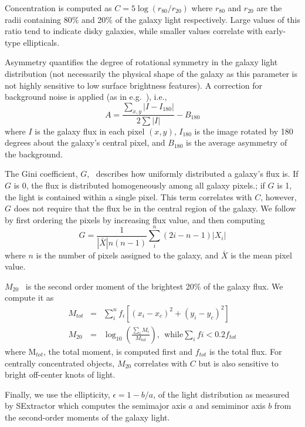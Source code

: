 \documentclass[twocolumn]{aastex6}
\newcommand{\rr}[1]{$r_{#1}$}
\newcommand{\M}[1]{$M_{#1}$}
\begin{document}
Concentration is computed as $C = 5\log(r_{80}/ r_{20})$ where \rr{80} and \rr{20} are the radii containing 80\% and 20\% of the galaxy light respectively.  Large values of this ratio tend to indicate disky galaxies, while smaller values correlate with early-type ellipticals. 

Asymmetry quantifies the degree of rotational symmetry in the galaxy light distribution (not necessarily the physical shape of the galaxy as this parameter is not highly sensitive to low surface brightness features). A correction for background noise is applied (as in e.g.~\cite{Conselice2000}), i.e., 
\begin{equation}
A = \frac{\sum_{x,y} |I - I_{180}|}{ 2\sum|I|} - B_{180}
\end{equation}
where $I$ is the galaxy flux in each pixel $(x, y)$, $I_{180}$ is the image rotated by 180 degrees about the galaxy's central pixel, and $B_{180}$ is the average asymmetry of the background. 

The Gini coefficient, $G$,~\citep{Glasser1962, Abraham2003} describes how uniformly distributed a galaxy's flux is.  If $G$ is 0, the flux is distributed homogeneously among all galaxy pixels.; if $G$ is 1,  the light is contained within a single pixel. This term correlates with $C$, however, $G$ does not require that the flux be in the central region of the galaxy.  We follow~\cite{Lotz2004} by first ordering the pixels by increasing flux value, and then computing
\begin{equation}
G = \frac{1}{|\bar X|n(n-1)}\sum_i^n(2i-n-1)|X_i|
\end{equation}
where $n$ is the number of pixels assigned to the galaxy, and $\bar X$ is the mean pixel value. 

\M{20}~\citep{Lotz2004} is the second order moment of the brightest 20\% of the galaxy flux. We compute it as
\begin{eqnarray}
 M_{tot} & = & \sum_i^nf_i[(x_i-x_c)^2 + (y_i-y_c)^2]  \\
 M_{20} & = & \log_{10} (\frac{\sum_iM_i}{M_{tot}}), ~~\textrm{while} \sum_ifi < 0.2f_{tot}
\end{eqnarray}
where M$_{tot}$, the total moment, is computed first and $f_{tot}$ is the total flux. For centrally concentrated objects, \M{20} correlates with $C$ but is also sensitive to bright off-center knots of light. 

Finally, we use the ellipticity, $\epsilon = 1 - b/a$, of the light distribution as measured by SExtractor which computes the semimajor axis $a$ and semiminor axis $b$ from the second-order moments of the galaxy light.  
\end{document}
